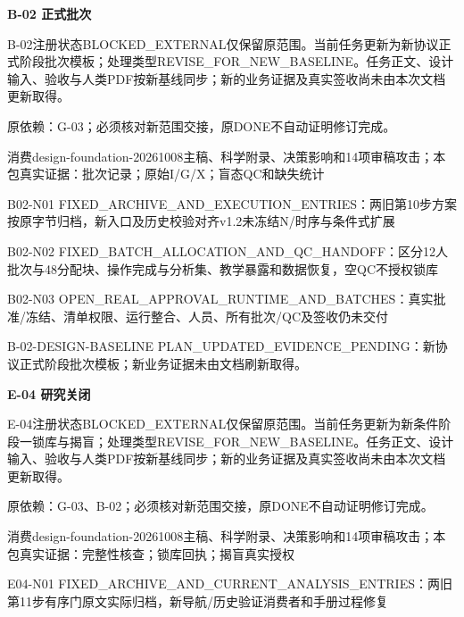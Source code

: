 \documentclass[11pt,a4paper]{article}
\newcommand{\reviewsection}[1]{\par\Needspace{5\baselineskip}\vspace{10pt}\begin{center}{\titlelatin\titlecjk\bfseries\fontsize{14}{20}\selectfont #1}\end{center}}
\begin{document}
\reviewsection{B-\allowbreak{}02 正式批次}
B-\allowbreak{}02注册状态BLOCKED\_\allowbreak{}EXTERNAL仅保留原范围。当前任务更新为新协议正式阶段批次模板；处理类型REVISE\_\allowbreak{}FOR\_\allowbreak{}NEW\_\allowbreak{}BASELINE。任务正文、设计输入、验收与人类PDF按新基线同步；新的业务证据及真实签收尚未由本次文档更新取得。


原依赖：G-\allowbreak{}03；必须核对新范围交接，原DONE不自动证明修订完成。


消费design-\allowbreak{}foundation-\allowbreak{}20261008主稿、科学附录、决策影响和14项审稿攻击；本包真实证据：批次记录；原始I/\allowbreak{}G/\allowbreak{}X；盲态QC和缺失统计


B02-\allowbreak{}N01 FIXED\_\allowbreak{}ARCHIVE\_\allowbreak{}AND\_\allowbreak{}EXECUTION\_\allowbreak{}ENTRIES：两旧第10步方案按原字节归档，新入口及历史校验对齐v1.2未冻结N/\allowbreak{}时序与条件式扩展


B02-\allowbreak{}N02 FIXED\_\allowbreak{}BATCH\_\allowbreak{}ALLOCATION\_\allowbreak{}AND\_\allowbreak{}QC\_\allowbreak{}HANDOFF：区分12人批次与48分配块、操作完成与分析集、教学暴露和数据恢复，空QC不授权锁库


B02-\allowbreak{}N03 OPEN\_\allowbreak{}REAL\_\allowbreak{}APPROVAL\_\allowbreak{}RUNTIME\_\allowbreak{}AND\_\allowbreak{}BATCHES：真实批准/\allowbreak{}冻结、清单权限、运行整合、人员、所有批次/\allowbreak{}QC及签收仍未交付


B-\allowbreak{}02-\allowbreak{}DESIGN-\allowbreak{}BASELINE PLAN\_\allowbreak{}UPDATED\_\allowbreak{}EVIDENCE\_\allowbreak{}PENDING：新协议正式阶段批次模板；新业务证据未由文档刷新取得。


\reviewsection{E-\allowbreak{}04 研究关闭}
E-\allowbreak{}04注册状态BLOCKED\_\allowbreak{}EXTERNAL仅保留原范围。当前任务更新为新条件阶段一锁库与揭盲；处理类型REVISE\_\allowbreak{}FOR\_\allowbreak{}NEW\_\allowbreak{}BASELINE。任务正文、设计输入、验收与人类PDF按新基线同步；新的业务证据及真实签收尚未由本次文档更新取得。


原依赖：G-\allowbreak{}03、B-\allowbreak{}02；必须核对新范围交接，原DONE不自动证明修订完成。


消费design-\allowbreak{}foundation-\allowbreak{}20261008主稿、科学附录、决策影响和14项审稿攻击；本包真实证据：完整性核查；锁库回执；揭盲真实授权


E04-\allowbreak{}N01 FIXED\_\allowbreak{}ARCHIVE\_\allowbreak{}AND\_\allowbreak{}CURRENT\_\allowbreak{}ANALYSIS\_\allowbreak{}ENTRIES：两旧第11步有序门原文实际归档，新导航/\allowbreak{}历史验证消费者和手册过程修复
\end{document}
